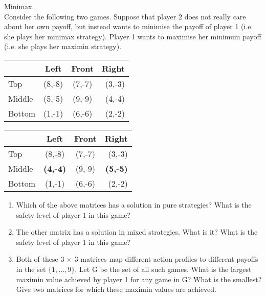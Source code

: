 \documentclass[../main.tex]{subfiles}
\begin{document}
\begin{question}
	Minimax.\\
	Consider the following two games. Suppose that player 2 does not really care about her own payoff, but instead wants to minimise the payoff of player 1 (i.e. she plays her minimax strategy). Player 1 wants to maximise her minimum payoff (i.e. she plays her maximin strategy).
	
	\begin{center}
	\begin{tabular}{|l|c|c|r|}
	    \hline
	    & Left & Front & Right \\
	    \hline
	    Top & (8,-8) & (7,-7) & (3,-3) \\
	    \hline
	    Middle & (5,-5) & (9,-9) & (4,-4) \\
	    \hline
	    Bottom & (1,-1) & (6,-6) & (2,-2) \\
	    \hline
	\end{tabular}
	\quad
	\begin{tabular}{|l|c|c|r|}
	    \hline
	    & Left & Front & Right \\
	    \hline
	    Top & (8,-8) & (7,-7) & (3,-3) \\
	    \hline
	    Middle & \textbf{(4,-4)} & (9,-9) & \textbf{(5,-5)} \\
	    \hline
	    Bottom & (1,-1) & (6,-6) & (2,-2) \\
	    \hline
	\end{tabular}
	\end{center}
	
	\begin{enumerate}
		\item Which of the above matrices has a solution in pure strategies? What is the safety level of player 1 in this game?
		\item The other matrix has a solution in mixed strategies. What is it? What is the safety level of player 1 in this game?
		\item Both of these 3 $\times$ 3 matrices map different action profiles to different payoffs in the set $\{1, ... ,9\}$.
		Let G be the set of all such games. What is the largest maximin value achieved by player 1 for any
		game in G? What is the smallest? Give two matrices for which these maximin values are achieved.
	\end{enumerate}
	
\end{question}
\end{document}
